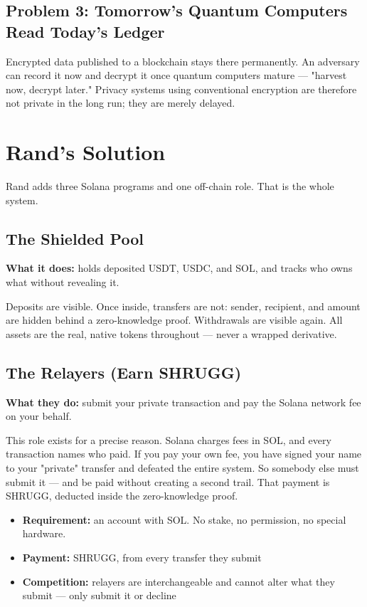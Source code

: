 \documentclass[11pt,a4paper]{article}
\begin{document}
\subsection{Problem 3: Tomorrow's Quantum Computers Read Today's Ledger}

Encrypted data published to a blockchain stays there permanently. An adversary can record it now and decrypt it once quantum computers mature --- "harvest now, decrypt later." Privacy systems using conventional encryption are therefore not private in the long run; they are merely delayed.

\section{Rand's Solution}

Rand adds three Solana programs and one off-chain role. That is the whole system.

\subsection{The Shielded Pool}

\textbf{What it does:} holds deposited USDT, USDC, and SOL, and tracks who owns what without revealing it.

Deposits are visible. Once inside, transfers are not: sender, recipient, and amount are hidden behind a zero-knowledge proof. Withdrawals are visible again. All assets are the real, native tokens throughout --- never a wrapped derivative.

\subsection{The Relayers (Earn SHRUGG)}

\textbf{What they do:} submit your private transaction and pay the Solana network fee on your behalf.

This role exists for a precise reason. Solana charges fees in SOL, and every transaction names who paid. If you pay your own fee, you have signed your name to your "private" transfer and defeated the entire system. So somebody else must submit it --- and be paid without creating a second trail. That payment is SHRUGG, deducted inside the zero-knowledge proof.

\begin{itemize}[leftmargin=*]
    \item \textbf{Requirement:} an account with SOL. No stake, no permission, no special hardware.
    \item \textbf{Payment:} SHRUGG, from every transfer they submit
    \item \textbf{Competition:} relayers are interchangeable and cannot alter what they submit --- only submit it or decline
\end{itemize}
\end{document}
